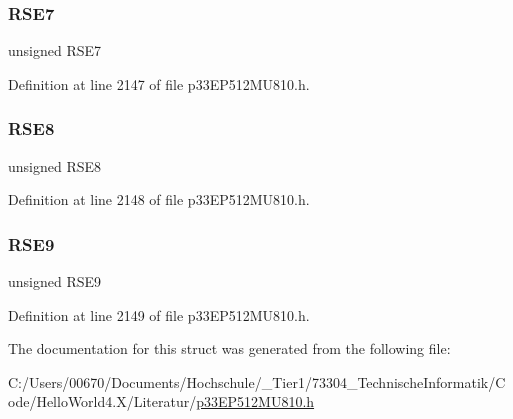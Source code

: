 \subsubsection{\texorpdfstring{R\+S\+E7}{RSE7}}
{\footnotesize\ttfamily unsigned R\+S\+E7}



Definition at line 2147 of file p33\+E\+P512\+M\+U810.\+h.

\mbox{\label{structtag_r_s_c_o_n_b_i_t_s_ad04770efbf0c445b4ad789e4d783d278}} 
\subsubsection{\texorpdfstring{R\+S\+E8}{RSE8}}
{\footnotesize\ttfamily unsigned R\+S\+E8}



Definition at line 2148 of file p33\+E\+P512\+M\+U810.\+h.

\mbox{\label{structtag_r_s_c_o_n_b_i_t_s_a13ca701f9cfc374a4490c7c9e5c55f41}} 
\subsubsection{\texorpdfstring{R\+S\+E9}{RSE9}}
{\footnotesize\ttfamily unsigned R\+S\+E9}



Definition at line 2149 of file p33\+E\+P512\+M\+U810.\+h.



The documentation for this struct was generated from the following file\+:\begin{DoxyCompactItemize}
\item 
C\+:/\+Users/00670/\+Documents/\+Hochschule/\+\_\+\+Tier1/73304\+\_\+\+Technische\+Informatik/\+Code/\+Hello\+World4.\+X/\+Literatur/\hyperlink{p33_e_p512_m_u810_8h}{p33\+E\+P512\+M\+U810.\+h}\end{DoxyCompactItemize}
